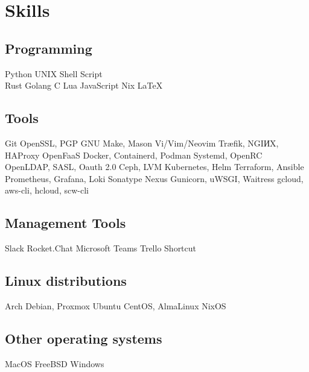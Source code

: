\documentclass[]{lib/cv}
\begin{document}
\begin{minipage}[t]{0.30\textwidth} 

\section{Skills}
\sectionsep

\subsection{Programming}
  Python \separ{} UNIX Shell Script \\

\sectionsep
{}
  Rust \separ{}
  Golang \separ{} 
  C \separ{}
  Lua \separ{}
  JavaScript \separ{}
  Nix \separ{}
  \LaTeX\ \\

\sectionsep
\subsection{Tools}
  \sectionsep
           Git 
  \separ{} OpenSSL, PGP
  \separ{} GNU Make, Mason
  \separ{} Vi/Vim/Neovim 
  \separ{} Træfik, NGIИX, HAProxy
  \separ{} OpenFaaS
  \separ{} Docker, Containerd, Podman
  \separ{} Systemd, OpenRC
  \separ{} OpenLDAP, SASL, Oauth 2.0
  \separ{} Ceph, LVM
  \separ{} Kubernetes, Helm
  \separ{} Terraform, Ansible
  \separ{} Prometheus, Grafana, Loki
  \separ{} Sonatype Nexus
  \separ{} Gunicorn, uWSGI, Waitress
  \separ{} gcloud, aws-cli, hcloud, scw-cli
\sectionsep

\subsection{Management Tools}
\sectionsep
  \separ{} 
  Slack \separ{}
  Rocket.Chat \separ{}
  Microsoft Teams \separ{}
  Trello  \separ{}
  Shortcut \separ{}
  \sectionsep

\subsection{Linux distributions}
  \sectionsep
           Arch
  \separ{} Debian, Proxmox
  \separ{} Ubuntu
  \separ{} CentOS, AlmaLinux
  \separ{} NixOS

\subsection{Other operating systems}
  \sectionsep
           MacOS
  \separ{} FreeBSD
  \separ{} Windows


\end{minipage}
\end{document}
